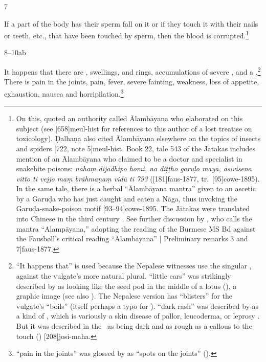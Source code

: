 \begin{translation}
\item[7]

If a part of the body has their sperm fall on it or if they touch it
with their nails or teeth, etc., that have been touched by sperm,
then the blood is corrupted.\footnote{On this, 
    quoted an authority called Ālambāyana who elaborated on this subject
    (see [658]{meul-hist} for references to this author of a
    lost treatise on toxicology). Ḍalhaṇa also cited Ālambāyana elsewhere
    on the topics of insects and spiders [722, note
    5]{meul-hist}. Book 22, tale 543 of the Jātakas includes mention of
    an Ālambāyana who claimed to be a doctor and specialist in snakebite
    poisons: \emph{nāhaṃ dijādhipo homi, na diṭṭho garuḷo mayā, āsīvisena
    vitto ti vejjo maṃ brāhmaṇaṃ vidū ti 793}
    ([181]{faus-1877}, tr.\  [95]{cowe-1895}). In
    the same tale, there is a herbal “Ālambāyana mantra” given to an 
    ascetic by a Garuḍa who has just caught and eaten a Nāga, thus
    invoking the Garuḍa-snake-poison motif
    [93--94]{cowe-1895}.  The Jātakas were translated into
    Chinese in the third century \CE.
%    
%    
%    
    See further discussion by \citet[33--34]{slou-2016}, who calls the mantra 
    “Alampāyana,” adopting the reading of the Burmese MS Bd against the 
    Fausbøll's critical reading  “Ālambāyana”  [ 
    Preliminary remarks 3 and 7]{faus-1877}.}
    
\item[8--10ab]

It happens that there are , swellings,
 and rings, accumulations of
severe ,  and a
.\footnote{“It happens that” is used because
    the Nepalese witnesses use the singular , against the
    vulgate's more natural plural.  “little ears” was
    strikingly described by  as looking like the seed
    pod in the middle of a lotus (), a
    graphic image (see also ). %
    The Nepalese version has  “blisters” for the
    vulgate's  “boils” (itself perhaps a typo for
    ).   “dark rash” was described by
     as a kind of , which is
    variously a skin disease of pallor, leucoderma, or leprosy
    \citep{emme-1984}. But it was described in the \CS\ as being dark
    and as rough as a callous to the touch ()
    [208]{josi-maha}.}  There  is pain in the joints,
    pain, fever, severe fainting, weakness, loss of appetite,
    exhaustion, nausea and horripilation.\footnote{
        “pain in the joints” was glossed by  as
        “spots on the joints” ().}
        


\end{translation}

